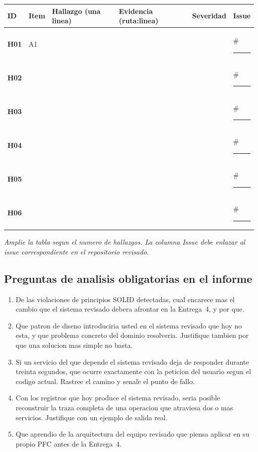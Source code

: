 \documentclass[11pt,a4paper]{article}
\begin{document}
\noindent
\begin{tabularx}{\linewidth}{@{}>{\bfseries}p{1.0cm} >{\centering\arraybackslash}p{1.0cm} X >{\RaggedRight}p{2.4cm} >{\centering\arraybackslash}p{2.1cm} >{\centering\arraybackslash}p{1.6cm}@{}}
    \toprule
    \rowcolor{uteqSoft}\textbf{\color{uteqBlue}ID} & \textbf{\color{uteqBlue}Item} & \textbf{\color{uteqBlue}Hallazgo (una linea)} & \textbf{\color{uteqBlue}Evidencia (ruta:linea)} & \textbf{\color{uteqBlue}Severidad} & \textbf{\color{uteqBlue}Issue} \\
    \midrule
    H01 & A1 & & & & \#\rule{0.6cm}{0.3pt} \\
    H02 & & & & & \#\rule{0.6cm}{0.3pt} \\
    H03 & & & & & \#\rule{0.6cm}{0.3pt} \\
    H04 & & & & & \#\rule{0.6cm}{0.3pt} \\
    H05 & & & & & \#\rule{0.6cm}{0.3pt} \\
    H06 & & & & & \#\rule{0.6cm}{0.3pt} \\
    \bottomrule
\end{tabularx}

\vspace{4pt}
\noindent\textit{Amplie la tabla segun el numero de hallazgos. La columna Issue debe enlazar al issue correspondiente en el repositorio revisado.}

\subsection{Preguntas de analisis obligatorias en el informe}

\begin{enumerate}
    \item De las violaciones de principios SOLID detectadas, cual encarece mas el cambio que el sistema revisado debera afrontar en la Entrega~4, y por que.
    \item Que patron de diseno introduciria usted en el sistema revisado que hoy no esta, y que problema concreto del dominio resolveria. Justifique tambien por que una solucion mas simple no basta.
    \item Si un servicio del que depende el sistema revisado deja de responder durante treinta segundos, que ocurre exactamente con la peticion del usuario segun el codigo actual. Rastree el camino y senale el punto de fallo.
    \item Con los registros que hoy produce el sistema revisado, seria posible reconstruir la traza completa de una operacion que atraviesa dos o mas servicios. Justifique con un ejemplo de salida real.
    \item Que aprendio de la arquitectura del equipo revisado que piensa aplicar en su propio PFC antes de la Entrega~4.
\end{enumerate}
\end{document}

